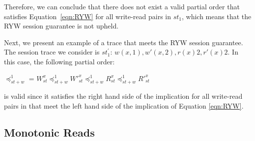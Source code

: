 \documentclass[journal,compsoc]{IEEEtran}
\begin{document}
  Therefore, we can conclude that there does not exist a valid partial order that satisfies Equation~\ref{eqn:RYW} for all write-read pairs in $\mathit{st}_1$, which means that the RYW session guarantee is not upheld.  
  
Next, we present an example of a  trace that meets the RYW session guarantee. The session trace we consider is $\mathit{st}^{'}_1$: $w(x,1), w'(x,2), r(x){2}, r'(x){2}$. In this case, the following partial order:

$\preccurlyeq_{\mathit{st}+w}^1$ = $W^x_{\mathit{st}} \preccurlyeq_{\mathit{st}+w}^1 W'^x_{\mathit{st}} \preccurlyeq_{\mathit{st}+w}^1 R^x_{\mathit{st}}
  \preccurlyeq_{\mathit{st}+w}^1 R'^x_{\mathit{st}}$ 
  
\noindent is valid since it satisfies the right hand side of the implication for all write-read pairs in that meet the left hand side of the implication of Equation  \ref{eqn:RYW}.



\subsection{Monotonic Reads}
\end{document}
